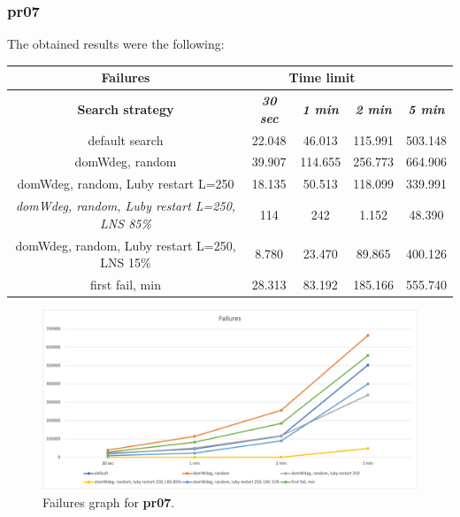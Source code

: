 \subsubsection{pr07}
The obtained results were the following:
{
\renewcommand{\arraystretch}{2}
\begin{longtable}[h]{| c | c | c | c | c |}
    \hline
    \textbf{Failures} & \multicolumn{3}{c}{Time limit} & \\
    \hline
    \textbf{Search strategy} & \textbf{\textit{30 sec}} & \textbf{\textit{1 min}} & \textbf{\textit{2 min}} & \textbf{\textit{5 min}} \\
    \hline
    \endhead
    default search                                         & 22.048 &  46.013 & 115.991 & 503.148 \\
    \hline
    domWdeg, random                                        & 39.907 & 114.655 & 256.773 & 664.906 \\
    \hline
    domWdeg, random, Luby restart L=250                    & 18.135 &  50.513 & 118.099 & 339.991 \\
    \hline
    \textit{domWdeg, random, Luby restart L=250, LNS 85\%} &   114 &    242 &   1.152 &  48.390 \\
    \hline
    domWdeg, random, Luby restart L=250, LNS 15\%          &  8.780 &  23.470 &  89.865 & 400.126 \\
    \hline
    first fail, min                                        & 28.313 &  83.192 & 185.166 & 555.740 \\
    \hline
\end{longtable}
}
\begin{figure}[H]
    \centering
    \includegraphics[width=0.8\columnwidth]{../graphs/pr07-failures.png}
    \caption{Failures graph for \textbf{pr07}.}
\end{figure}

